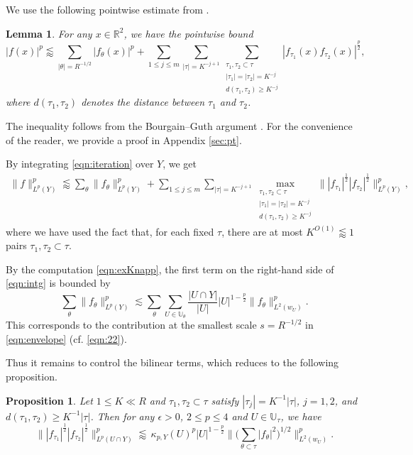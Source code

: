 \documentclass[11pt]{amsart}
\newtheorem{lemma}[theorem]{Lemma}
\newtheorem{prop}[theorem]{Proposition}
\theoremstyle{definition}
\theoremstyle{remark}
\newcommand{\R}{\mathbb{R}}
\newcommand{\U}{\mathbb{U}}
\newcommand{\less}{\lessapprox}
\begin{document}
We use the following pointwise estimate from \cite[Section 5]{DGW}.
\begin{lemma}\label{ptwise bound}
For any $x\in \R^2$, we have the pointwise bound
\begin{equation}\label{eqn:iteration}
  |f(x)|^p \less \sum_{|\theta|=R^{-1/2}} |f_{\theta}(x)|^{p} + \sum_{1\leq j\leq m} \sum_{|\tau|=K^{-j+1}} \sum_{\substack{\tau_1,\tau_2\subset \tau \\ |\tau_1|=|\tau_2| = K^{-j}  \\ d(\tau_1,\tau_2)\geq   K^{-j}}} |f_{\tau_1}(x)f_{\tau_2}(x)|^{\frac p2},
\end{equation}
where $d(\tau_1,\tau_2)$ denotes the distance between $\tau_1$ and $\tau_2$. 
\end{lemma}
The inequality follows from the Bourgain--Guth argument \cite{BG}. For the convenience of the reader, we provide a proof in Appendix \ref{sec:pt}. 

By integrating \eqref{eqn:iteration} over $Y$, we get 
\begin{align}\label{eqn:intg}
	\|f\|_{L^p(Y)}^p \less \sum_{\theta} \| f_{\theta} \|_{L^p(Y)}^p + \sum_{1\leq j\leq m} \sum_{|\tau|=K^{-j+1}} \max_{\substack{\tau_1,\tau_2\subset \tau \\ |\tau_1|=|\tau_2| = K^{-j}  \\ d(\tau_1,\tau_2)\geq  K^{-j}}}   \!\!\big\| |f_{\tau_1}|^{\frac12} |f_{\tau_2}|^{\frac12}\big\|_{L^p(Y)}^p,
\end{align}
where we have used the fact that, for each fixed $\tau$, there are at most $K^{O(1)} \less 1$ pairs $\tau_1, \tau_2 \subset \tau$. 

By the computation \eqref{eqn:exKnapp}, the first term on the right-hand side of \eqref{eqn:intg} is bounded by
\[
\sum_{\theta} \| f_{\theta} \|_{L^p(Y)}^p
\lesssim
\sum_{\theta} \sum_{U\in \U_\theta}\frac{|U\cap Y|}{|U|} |U|^{1-\frac{p}{2}} \| f_\theta\|_{L^2(w_U)}^p.
\]
This corresponds to the contribution at the smallest scale $s=R^{-1/2}$ in \eqref{eqn:envelope} (cf. \eqref{eqn:22}).



Thus it remains to control the bilinear terms, which reduces to the following proposition.

\begin{prop}\label{prop:bil-lp}
Let $1\le K \ll R$ and $\tau_1,\tau_2\subset \tau$ satisfy $|\tau_j|=K^{-1}|\tau|$, $j=1,2$, and $d(\tau_1,\tau_2)\ge K^{-1}|\tau|$. Then for any $\epsilon>0$, $2\le p \le 4$ and $U\in \U_{\tau}$, we have
\begin{equation}\label{eqn:localbilinear}
       \big\| |f_{\tau_1}|^{\frac12} |f_{\tau_2}|^{\frac12}\big\|_{L^p(U\cap Y)}^p  \less  
        \,\kappa_{p,Y}(U)^p |U|^{1-\frac{p}{2}} \big\| \big(\sum_{\theta \subset \tau} |f_{\theta}|^2 \big)^{1/2}  \big\|_{L^2(w_{U})}^p.
\end{equation}
\end{prop}
\end{document}
